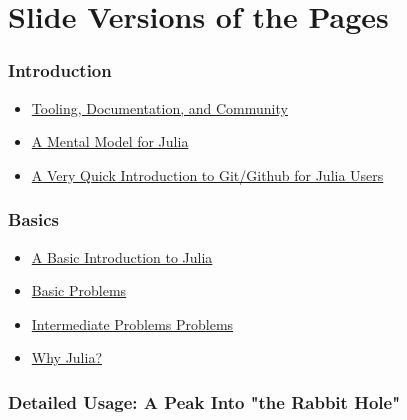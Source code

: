 \documentclass[11pt]{article}
\providecommand{\tightlist}{%
      \setlength{\itemsep}{0pt}\setlength{\parskip}{0pt}}
\begin{document}
    \section{Slide Versions of the Pages}\label{slide-versions-of-the-pages}

\subsubsection{Introduction}\label{introduction}

\begin{itemize}
\tightlist
\item
  \href{http://ucidatascienceinitiative.github.io/IntroToJulia/Slides/ToolingDocumentationCommunity}{Tooling,
  Documentation, and Community}
\item
  \href{http://ucidatascienceinitiative.github.io/IntroToJulia/Slides/JuliaMentalModel}{A
  Mental Model for Julia}
\item
  \href{http://ucidatascienceinitiative.github.io/IntroToJulia/Slides/GithubIntroduction}{A
  Very Quick Introduction to Git/Github for Julia Users}
\end{itemize}

\subsubsection{Basics}\label{basics}

\begin{itemize}
\tightlist
\item
  \href{http://ucidatascienceinitiative.github.io/IntroToJulia/Slides/BasicIntroduction}{A
  Basic Introduction to Julia}
\item
  \href{http://ucidatascienceinitiative.github.io/IntroToJulia/Slides/BasicProblems}{Basic
  Problems}
\item
  \href{http://ucidatascienceinitiative.github.io/IntroToJulia/Slides/BasicProblems}{Intermediate
  Problems Problems}
\item
  \href{http://ucidatascienceinitiative.github.io/IntroToJulia/Slides/WhyJulia}{Why
  Julia?}
\end{itemize}

\subsubsection{Detailed Usage: A Peak Into "the Rabbit
Hole"}\label{detailed-usage-a-peak-into-the-rabbit-hole}
\end{document}
